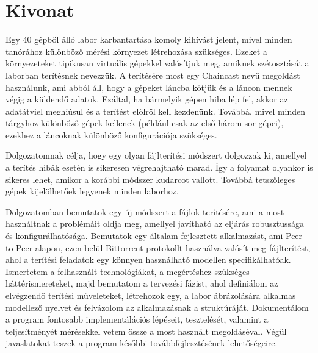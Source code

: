 \setcounter{page}{1}

\selecthungarian
\chapter*{Kivonat}

Egy 40 gépből álló labor karbantartása komoly kihívást jelent, mivel minden tanórához különböző mérési környezet létrehozása szükséges.
Ezeket a környezeteket tipikusan virtuális gépekkel valósítjuk meg, amiknek szétosztását a laborban terítésnek nevezzük. A terítésére most egy Chaincast nevű megoldást használunk, ami abból áll, hogy a gépeket láncba kötjük és a láncon mennek végig a küldendő adatok. Ezáltal, ha bármelyik gépen hiba lép fel, akkor az adatátviel meghiúsul és a terítést előlről kell kezdenünk. Továbbá, mivel minden tárgyhoz különbőző gépek kellenek (például csak az első három sor gépei), ezekhez a láncoknak különböző konfigurációja szükséges.

Dolgozatomnak célja, hogy egy olyan fájlterítési módszert dolgozzak ki, amellyel a terítés hibák esetén is sikeresen végrehajtható marad. Így a folyamat olyankor is sikeres lehet, amikor a korábbi módszer kudarcot vallott. Továbbá tetszőleges gépek kijelölhetőek legyenek minden laborhoz.

Dolgozatomban bemutatok egy új módszert a fájlok terítésére, ami a most használtnak a problémáit oldja meg, amellyel javítható az eljárás robusztussága és konfigurálhatósága. Bemutatok egy általam fejlesztett alkalmazást, ami Peer-to-Peer-alapon, ezen belül Bittorrent protokollt használva valósít meg fájlterítést, ahol a terítési feladatok egy könnyen használható modellen specifikálhatóak. Ismertetem a felhasznált technológiákat, a megértéshez szükséges háttérismereteket, majd bemutatom a tervezési fázist, ahol definiálom az elvégzendő terítési műveleteket, létrehozok egy, a labor ábrázolására alkalmas modellező nyelvet és felvázolom az alkalmazásnak a struktúráját. Dokumentálom a program fontosabb implementálációs lépéseit, tesztelését, valamint a teljesítményét mérésekkel vetem össze a most használt megoldáséval. Végül javaslatokat teszek a program későbbi továbbfejlesztésének lehetőségeire.
\vfill

\selectenglish
